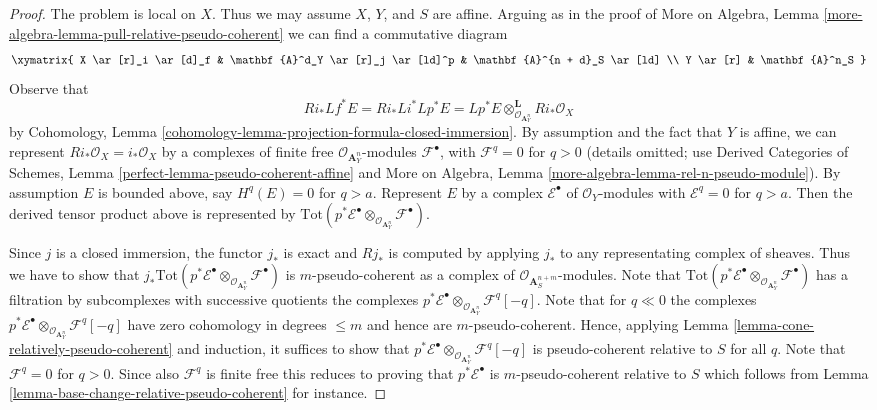 \begin{proof}
The problem is local on $X$. Thus we may assume $X$, $Y$, and $S$ are affine.
Arguing as in the proof of More on Algebra, Lemma
\ref{more-algebra-lemma-pull-relative-pseudo-coherent}
we can find a commutative diagram
$$
\xymatrix{
X \ar[r]_i \ar[d]_f &
\mathbf{A}^d_Y \ar[r]_j \ar[ld]^p &
\mathbf{A}^{n + d}_S \ar[ld] \\
Y \ar[r] &
\mathbf{A}^n_S
}
$$
Observe that
$$
Ri_* Lf^*E = Ri_* Li^* Lp^*E =
Lp^*E \otimes_{\mathcal{O}_{\mathbf{A}_Y^n}}^\mathbf{L} Ri_*\mathcal{O}_X
$$
by Cohomology, Lemma
\ref{cohomology-lemma-projection-formula-closed-immersion}.
By assumption and the fact that $Y$ is affine, we can represent
$Ri_*\mathcal{O}_X = i_*\mathcal{O}_X$ by a complexes of finite free
$\mathcal{O}_{\mathbf{A}_Y^n}$-modules $\mathcal{F}^\bullet$, with
$\mathcal{F}^q = 0$ for $q > 0$
(details omitted; use Derived Categories of Schemes, Lemma
\ref{perfect-lemma-pseudo-coherent-affine}
and
More on Algebra, Lemma
\ref{more-algebra-lemma-rel-n-pseudo-module}).
By assumption $E$ is bounded above, say $H^q(E) = 0$ for $q > a$.
Represent $E$ by a complex $\mathcal{E}^\bullet$ of $\mathcal{O}_Y$-modules
with $\mathcal{E}^q = 0$ for $q > a$. Then the derived tensor product above
is represented by $\text{Tot}(p^*\mathcal{E}^\bullet
\otimes_{\mathcal{O}_{\mathbf{A}_Y^n}} \mathcal{F}^\bullet)$.

\medskip\noindent
Since $j$ is a closed immersion, the functor $j_*$ is exact and
$Rj_*$ is computed by applying $j_*$ to any representating complex
of sheaves. Thus we have to show that
$j_*\text{Tot}(p^*\mathcal{E}^\bullet \otimes_{\mathcal{O}_{\mathbf{A}_Y^n}}
\mathcal{F}^\bullet)$ is $m$-pseudo-coherent
as a complex of $\mathcal{O}_{\mathbf{A}^{n + m}_S}$-modules.
Note that
$\text{Tot}(p^*\mathcal{E}^\bullet \otimes_{\mathcal{O}_{\mathbf{A}_Y^n}}
\mathcal{F}^\bullet)$ has a filtration by
subcomplexes with successive quotients the complexes
$p^*\mathcal{E}^\bullet
\otimes_{\mathcal{O}_{\mathbf{A}_Y^n}} \mathcal{F}^q[-q]$.
Note that for $q \ll 0$ the complexes
$p^*\mathcal{E}^\bullet \otimes_{\mathcal{O}_{\mathbf{A}_Y^n}}
\mathcal{F}^q[-q]$
have zero cohomology in degrees $\leq m$ and hence are $m$-pseudo-coherent.
Hence, applying
Lemma \ref{lemma-cone-relatively-pseudo-coherent}
and induction, it suffices to show that
$p^*\mathcal{E}^\bullet \otimes_{\mathcal{O}_{\mathbf{A}_Y^n}}
\mathcal{F}^q[-q]$
is pseudo-coherent relative to $S$ for all $q$. Note that $\mathcal{F}^q = 0$
for $q > 0$. Since also $\mathcal{F}^q$ is finite free this
reduces to proving that $p^*\mathcal{E}^\bullet$ is
$m$-pseudo-coherent relative to $S$ which follows from
Lemma \ref{lemma-base-change-relative-pseudo-coherent}
for instance.
\end{proof}


